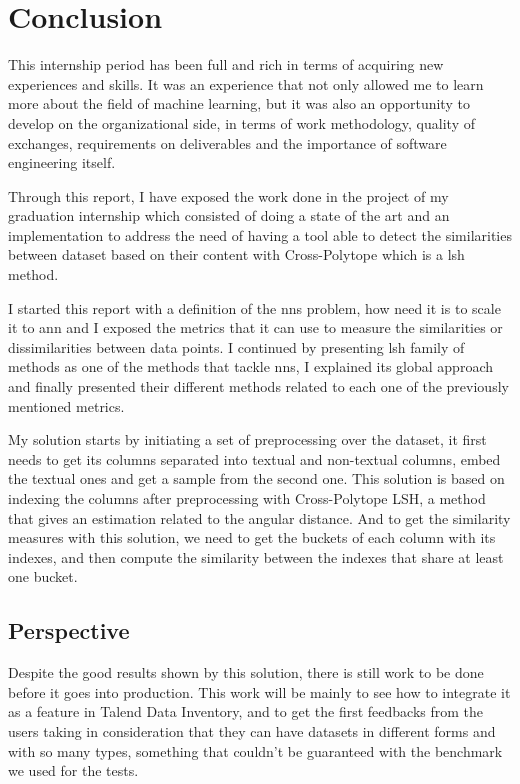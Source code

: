\chapter*{Conclusion}

This internship period has been full and rich in terms of acquiring new
experiences and skills. It was an experience that not only allowed me to learn
more about the field of machine learning, but it was also an opportunity to
develop on the organizational side, in terms of work methodology, quality of
exchanges, requirements on deliverables and the importance of software
engineering itself. 


Through this report, I have exposed the work done in the project of my graduation
internship which consisted of doing a state of the art and an implementation to
address the need of having a tool able to detect the similarities between
dataset based on their content with Cross-Polytope which is a \acrfull{lsh}
method.

I started this report with a definition of the \acrfull{nns} problem, how need
it is to scale it to \acrfull{ann} and I exposed the metrics that it can use to
measure the similarities or dissimilarities between data points. I continued by
presenting \acrshort{lsh} family of methods as one of the methods that tackle
\acrshort{nns}, I explained its global approach and finally presented their
different methods related to each one of the previously mentioned metrics.

My solution starts by initiating a set of preprocessing over the dataset, it
first needs to get its columns separated into textual and non-textual columns,
embed the textual ones and get a sample from the second one. This solution is
based on indexing the columns after preprocessing with Cross-Polytope LSH, a
method that gives an estimation related to the angular distance. And to get the
similarity measures with this solution, we need to get the buckets of each
column with its indexes, and then compute the similarity between the indexes
that share at least one bucket.


\section*{Perspective}
Despite the good results shown by this solution, there is still work to be done
before it goes into production. This work will be mainly to see how to integrate
it as a feature in Talend Data Inventory, and to get the first feedbacks from
the users taking in consideration that they can have datasets in different forms
and with so many types, something that couldn't be guaranteed with the benchmark
we used for the tests.
